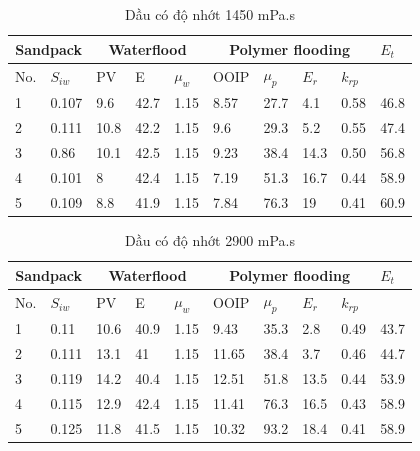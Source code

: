 \documentclass[12pt,a4paper]{article}
\begin{document}
\begin{table}[h]
\centering
\caption{Dầu có độ nhớt 1450 mPa.s}
\label{my-label}
\begin{tabularx}{\textwidth}{@{}XX|XXX|XXXX|X@{}}
\toprule
\multicolumn{2}{c}{Sandpack} & \multicolumn{3}{c}{Waterflood} & \multicolumn{4}{c}{Polymer flooding} & $E_t$ \\ \midrule
No.        & $S_{iw}$        & PV      & E    & $\mu_w$   & OOIP   & $\mu_p$  & $E_r$ & $k_{rp}$ &       \\
1          & 0.107           & 9.6     & 42.7     & 1.15      & 8.57   & 27.7     & 4.1   & 0.58     & 46.8  \\
2          & 0.111           & 10.8    & 42.2     & 1.15      & 9.6    & 29.3     & 5.2   & 0.55     & 47.4  \\
3          & 0.86            & 10.1    & 42.5     & 1.15      & 9.23   & 38.4     & 14.3  & 0.50     & 56.8  \\
4          & 0.101           & 8       & 42.4     & 1.15      & 7.19   & 51.3     & 16.7  & 0.44     & 58.9  \\
5          & 0.109           & 8.8     & 41.9     & 1.15      & 7.84   & 76.3     & 19    & 0.41     & 60.9  \\ \bottomrule
\end{tabularx}
\end{table}
\begin{table}[h]
\centering
\caption{Dầu có độ nhớt 2900 mPa.s}
\label{my-label}
\begin{tabularx}{\textwidth}{@{}XX|XXX|XXXX|X@{}}
\toprule
\multicolumn{2}{c}{Sandpack} & \multicolumn{3}{c}{Waterflood} & \multicolumn{4}{c}{Polymer flooding} & $E_t$ \\ \midrule
No.        & $S_{iw}$        & PV      & E    & $\mu_w$   & OOIP   & $\mu_p$  & $E_r$ & $k_{rp}$ &       \\
1          & 0.11            & 10.6    & 40.9     & 1.15      & 9.43   & 35.3     & 2.8   & 0.49     & 43.7  \\
2          & 0.111           & 13.1    & 41       & 1.15      & 11.65  & 38.4     & 3.7   & 0.46     & 44.7  \\
3          & 0.119           & 14.2    & 40.4     & 1.15      & 12.51  & 51.8     & 13.5  & 0.44     & 53.9  \\
4          & 0.115           & 12.9    & 42.4     & 1.15      & 11.41  & 76.3     & 16.5  & 0.43     & 58.9  \\
5          & 0.125           & 11.8    & 41.5     & 1.15      & 10.32  & 93.2     & 18.4  & 0.41     & 58.9  \\ \bottomrule
\end{tabularx}
\end{table}
\end{document}
